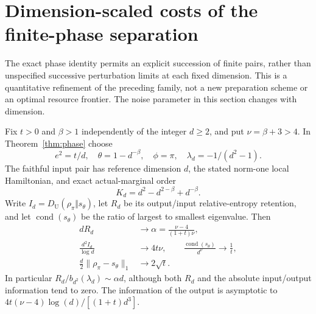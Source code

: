 \section{Dimension-scaled costs of the finite-phase separation}\label{sec:dimension-cost}
The exact phase identity permits an explicit succession of finite pairs, rather than unspecified successive perturbation limits at each fixed dimension. This is a quantitative refinement of the preceding family, not a new preparation scheme or an optimal resource frontier. The noise parameter in this section changes with dimension.

\begin{theorem}\label{thm:dimension-cost}
Fix $t>0$ and $\beta>1$ independently of the integer $d\ge2$, and put $\nu=\beta+3>4$. In Theorem~\ref{thm:phase} choose
\[
 e^2=t/d,\quad \theta=1-d^{-\beta},\quad \phi=\pi,
 \quad\lambda_d=-1/(d^2-1).
\]
The faithful input pair has reference dimension $d$, the stated norm-one local Hamiltonian, and exact actual-marginal order
\[
 K_d=d^2-d^{2-\beta}+d^{-\beta}.
\]
Write $I_d=D_{\mathrm U}(\rho_\pi\Vert s_\theta)$, let $R_d$ be its output/input relative-entropy retention, and let $\operatorname{cond}(s_\theta)$ be the ratio of largest to smallest eigenvalue. Then
\begin{align}
 dR_d&\longrightarrow\alpha=\frac{\nu-4}{(1+t)\nu},\label{eq:scaled-retention}\\
 \frac{d^2I_d}{\log d}&\longrightarrow4t\nu,\qquad
 \frac{\operatorname{cond}(s_\theta)}{d^\nu}\longrightarrow\frac1t,\label{eq:scaled-cost}\\
 \frac d2\|\rho_\pi-s_\theta\|_1&\longrightarrow2\sqrt t.
\end{align}
In particular $R_d/b_{d^2}(\lambda_d)\sim\alpha d$, although both $R_d$ and the absolute input/output information tend to zero. The information of the output is asymptotic to $4t(\nu-4)\log(d)/[(1+t)d^3]$.
\end{theorem}
